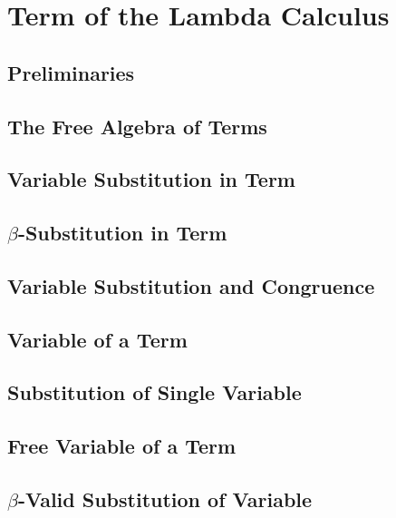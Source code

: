 \section{Term of the Lambda Calculus}
    \subsection{Preliminaries}
        
    \subsection{The Free Algebra of Terms}
        
    \subsection{Variable Substitution in Term}
        
    \subsection{$\beta$-Substitution in Term}
        
    \subsection{Variable Substitution and Congruence}
        
    \subsection{Variable of a Term}
        
    \subsection{Substitution of Single Variable}
        
    \subsection{Free Variable of a Term}
        
    \subsection{$\beta$-Valid Substitution of Variable}
        

